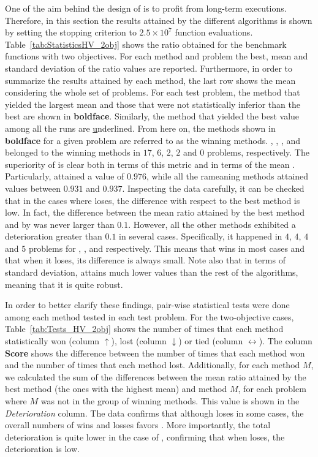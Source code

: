 One of the aim behind the design of \AVSDMOEAD{} is to profit from long-term executions.
%
Therefore, in this section the results attained by the different algorithms is shown by setting 
the stopping criterion to $2.5 \times 10^7$ function evaluations.
%
Table~\ref{tab:StatisticsHV_2obj} shows the \HV{} ratio obtained for the benchmark functions with two objectives.
%
For each method and problem the best, mean and standard deviation of the \HV{} ratio values are reported.
%
Furthermore, in order to summarize the results attained by each method, the last row shows the mean considering the whole set 
of problems.
%
For each test problem, the method that yielded the largest mean and those that were not statistically inferior than the 
best are shown in \textbf{boldface}.
%
Similarly, the method that yielded the best \HV{} value among all the runs are {\ul underlined}.
%
From here on, the methods shown in {\bf boldface} for a given problem are referred to as the winning methods.
%
\AVSDMOEAD{}, \RMOEA{}, \MOEADDE{}, \NSGAIII{} and \NSGAII{} belonged to the winning methods in 
$17$, $6$, $2$, $2$ and $0$ problems, respectively.
%
The superiority of \AVSDMOEAD{} is clear both in terms of this metric and in terms of the mean \HV{}.
%
Particularly, \AVSDMOEAD{} attained a value of $0.976$, while all the rameaning methods attained values between
$0.931$ and $0.937$.
%
Inspecting the data carefully, it can be checked that in the cases where \AVSDMOEAD{} loses, the difference with respect to the best 
method is low.
%
In fact, the difference between the mean \HV{} ratio attained by the best method and by \AVSDMOEAD{} was never larger than $0.1$.
%
However, all the other methods exhibited a deterioration greater than $0.1$ in several cases.
%
Specifically, it happened in $4$, $4$, $4$ and $5$ problems for \RMOEA{}, \MOEADDE{}, \NSGAII{} and \NSGAIII{} respectively.
%
This means that \AVSDMOEAD{} wins in most cases and that when it loses, its difference is always small.
%
Note also that in terms of standard deviation, \AVSDMOEAD{} attains much lower values than the rest of the algorithms, meaning that
it is quite robust.


In order to better clarify these findings, pair-wise statistical tests were done among each method tested in each test problem.
%
For the two-objective cases, Table~\ref{tab:Tests_HV_2obj} shows the number of times that each method statistically won 
(column $\uparrow$), lost (column $\downarrow$) or tied (column $\leftrightarrow$).
%
The column \textbf{Score} shows the difference between the number of times that each method won and the number of times that each 
method lost.
%
Additionally, for each method $M$, we calculated the sum of the differences between the mean \HV{} ratio attained by the best method 
(the ones with the highest mean) and method $M$, for each problem where $M$ was not in the group of winning methods.
%
This value is shown in the \textit{Deterioration} column.
%
The data confirms that although \AVSDMOEAD{} loses in some cases, the overall numbers of wins and losses favors \AVSDMOEAD{}.
%
More importantly, the total deterioration is quite lower in the case of \AVSDMOEAD{}, confirming that when \AVSDMOEAD{} loses, 
the deterioration is low.

